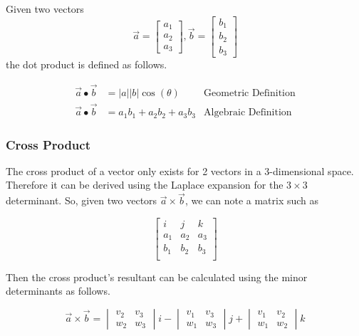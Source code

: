 Given two vectors
\[
	\vec{a} =
	\begin{bmatrix}
		a_1 \\ a_2 \\ a_3
	\end{bmatrix}
	, \vec{b} =
	\begin{bmatrix}
		b_1 \\ b_2 \\ b_3
	\end{bmatrix}
\]
the dot product is defined as follows.

\begin{align}
	\vec{a} \bullet \vec{b} & = |a||b|\cos( \theta )     & \text{Geometric Definition} \\
	\vec{a} \bullet \vec{b} & = a_1b_1 + a_2b_2 + a_3b_3 & \text{Algebraic Definition}
\end{align}
\subsubsection{Cross Product}

The cross product of a vector only exists for 2 vectors in a 3-dimensional space. Therefore it can be derived using the Laplace expansion for the \(3 \times 3\) determinant. So, given two vectors \(\vec{a} \times \vec{b}\), we can note a matrix such as

\begin{equation}
	\begin{bmatrix}
		i   & j   & k   \\
		a_1 & a_2 & a_3 \\
		b_1 & b_2 & b_3 \\
	\end{bmatrix}
\end{equation}

Then the cross product's resultant can be calculated using the minor determinants as follows.

\begin{equation}
	\vec{a} \times \vec{b} =
	\begin{vmatrix}
		{v_{2}} & {v_{3}} \\
		{w_{2}} & {w_{3}}
	\end{vmatrix}
	i -
	\begin{vmatrix}
		{v_{1}} & {v_{3}} \\
		{w_{1}} & {w_{3}}
	\end{vmatrix}
	j+
	\begin{vmatrix}
		{v_{1}} & {v_{2}} \\
		{w_{1}} & {w_{2}}
	\end{vmatrix}
	k
\end{equation}

